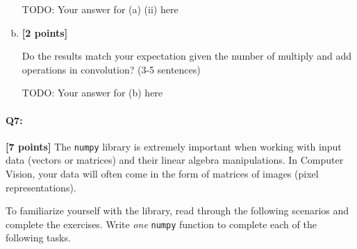 \begin{enumerate}[(a)]
    \begin{mdframed}
        TODO: Your answer for (a) (ii) here
    \end{mdframed}
    

\item \textbf{[2 points]} 
\begin{tcolorbox}[colback=orange!5!white,colframe=orange!75!black]
Do the results match your expectation given the number of multiply and add operations in convolution? (3-5 sentences)
\end{tcolorbox}
    
    \begin{mdframed}
        TODO: Your answer for (b) here
    \end{mdframed}
    
\end{enumerate}






\pagebreak
\paragraph{Q7:} \textbf{[7 points]} The \texttt{numpy} library is extremely important when working with input data (vectors or matrices) and their linear algebra manipulations. In Computer Vision, your data will often come in the form of matrices of images (pixel representations). 

 To familiarize yourself with the library, read through the following scenarios and complete the exercises. Write \emph{one} \texttt{numpy} function to complete each of the following tasks.

